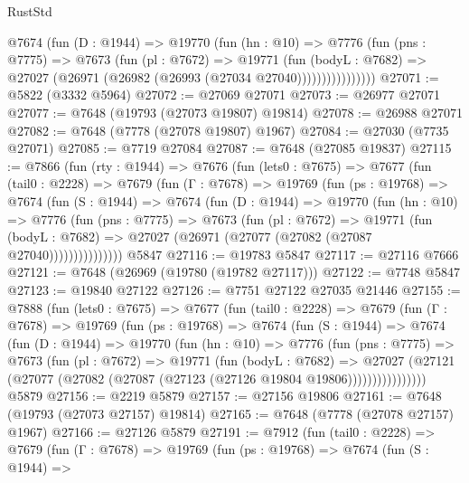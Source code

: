\begin{lexlean}{RustStd}
\begin{coremodule}
                @7674
                  (fun (D : @1944) =>
                  @19770
                    (fun (hn : @10) =>
                    @7776
                      (fun (pns : @7775) =>
                      @7673
                        (fun (pl : @7672) =>
                        @19771
                          (fun (bodyL : @7682) =>
                          @27027 (@26971 (@26982 (@26993 (@27034 @27040))))))))))))))))
@27071 := @5822 (@3332 @5964)
@27072 := @27069 @27071
@27073 := @26977 @27071
@27077 := @7648 (@19793 (@27073 @19807) @19814)
@27078 := @26988 @27071
@27082 := @7648 (@7778 (@27078 @19807) @1967)
@27084 := @27030 (@7735 @27071)
@27085 := @7719 @27084
@27087 := @7648 (@27085 @19837)
@27115 := @7866
    (fun (rty : @1944) =>
    @7676
      (fun (lets0 : @7675) =>
      @7677
        (fun (tail0 : @2228) =>
        @7679
          (fun (Γ : @7678) =>
          @19769
            (fun (ps : @19768) =>
            @7674
              (fun (S : @1944) =>
              @7674
                (fun (D : @1944) =>
                @19770
                  (fun (hn : @10) =>
                  @7776
                    (fun (pns : @7775) =>
                    @7673
                      (fun (pl : @7672) =>
                      @19771
                        (fun (bodyL : @7682) =>
                        @27027 (@26971 (@27077 (@27082 (@27087 @27040)))))))))))))))
    @5847
@27116 := @19783 @5847
@27117 := @27116 @7666
@27121 := @7648 (@26969 (@19780 (@19782 @27117)))
@27122 := @7748 @5847
@27123 := @19840 @27122
@27126 := @7751 @27122 @27035 @21446
@27155 := @7888
    (fun (lets0 : @7675) =>
    @7677
      (fun (tail0 : @2228) =>
      @7679
        (fun (Γ : @7678) =>
        @19769
          (fun (ps : @19768) =>
          @7674
            (fun (S : @1944) =>
            @7674
              (fun (D : @1944) =>
              @19770
                (fun (hn : @10) =>
                @7776
                  (fun (pns : @7775) =>
                  @7673
                    (fun (pl : @7672) =>
                    @19771
                      (fun (bodyL : @7682) =>
                      @27027
                        (@27121
                          (@27077 (@27082 (@27087 (@27123 (@27126 @19804 @19806))))))))))))))))
    @5879
@27156 := @2219 @5879
@27157 := @27156 @19806
@27161 := @7648 (@19793 (@27073 @27157) @19814)
@27165 := @7648 (@7778 (@27078 @27157) @1967)
@27166 := @27126 @5879
@27191 := @7912
    (fun (tail0 : @2228) =>
    @7679
      (fun (Γ : @7678) =>
      @19769
        (fun (ps : @19768) =>
        @7674
          (fun (S : @1944) =>

\end{coremodule}
\end{lexlean}
